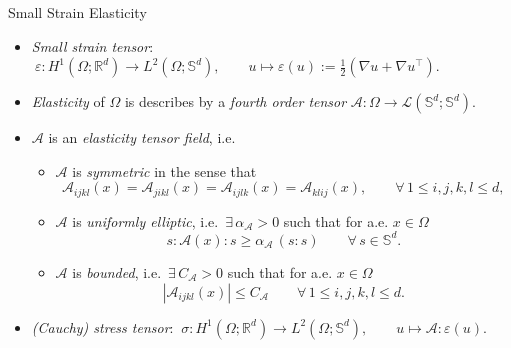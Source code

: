 \documentclass[10pt,aspectratio=169]{beamer}
\def\R{{\mathbb R}}
\def\S{{\mathbb S}}
\def\cA{{\mathcal A}}
\def\cL{{\mathcal L}}
\begin{document}
\begin{frame}{Small Strain Elasticity}
	\begin{itemize}
		\item {\em Small strain tensor}: $\ \varepsilon:H^1(\Omega;\R^d)\to L^2(\Omega;\S^d),\qquad u\mapsto \varepsilon(u):= \frac{1}{2}\left(\nabla u + \nabla u^\top\right)$.

		\item {\em Elasticity} of $\Omega$ is describes by a {\em fourth order tensor} $\cA:\Omega\to\cL(\S^d;\S^d)$.

		\item $\cA$ is an {\em elasticity tensor field}, i.e.\
		      \begin{itemize}
			      \item $\cA$ is {\em symmetric} in the sense that
			            \begin{equation*}
				            \cA_{ijkl}(x)=\cA_{jikl}(x)=\cA_{ijlk}(x)=\cA_{klij}(x),
				            \qquad \forall\,1\le i,j,k,l\le d,
			            \end{equation*}
			      \item $\cA$ is {\em uniformly elliptic}, i.e.\ $\exists\,\alpha_{\cA}>0$ such that for a.e. $x\in\Omega$
			            \begin{equation*}
				            s:\cA(x):s \ge \alpha_\cA\, (s:s)\qquad \forall\,s\in \S^d.
			            \end{equation*}
			      \item $\cA$ is {\em bounded}, i.e.\ $\exists\,C_{\cA}>0$ such that for a.e. $x\in\Omega$
			            \begin{equation*}
				            |\cA_{ijkl}(x)|\le C_\cA \qquad \forall\,1\le i,j,k,l\le d.
			            \end{equation*}
		      \end{itemize}
		\item {\em (Cauchy) stress tensor}: $\ \sigma: H^1(\Omega;\R^d)\to L^2(\Omega;\S^d),\qquad u\mapsto \cA : \varepsilon(u)$.
	\end{itemize}
\end{frame}
\end{document}
